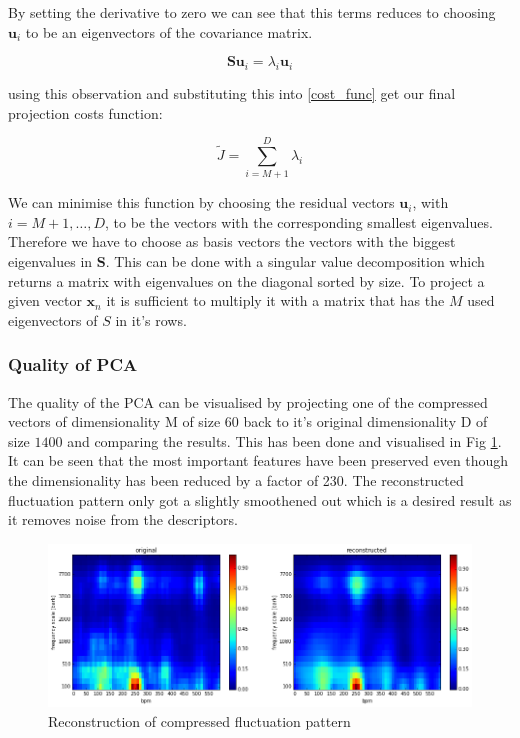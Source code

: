 \documentclass[cic,tc,english]{iiufrgs}
\begin{document}
By setting the derivative to zero we can see that this terms reduces to choosing $\bm{u}_i$ to be an eigenvectors of the covariance matrix.

\begin{equation}
\bm{S}\bm{u}_i = \lambda_i \bm{u}_i
\end{equation}

using this observation and substituting this into \ref{cost_func} get our final projection costs function:

\begin{equation}
\tilde{J} = \sum_{i = M+1}^{D} \lambda_i
\end{equation}

We can minimise this function by choosing the residual vectors $\bm{u}_i$, with $i = M+1, \ldots, D$, to be the vectors with the corresponding smallest eigenvalues. Therefore we have to choose as basis vectors the vectors with the biggest eigenvalues in $\bm{S}$. This can be done with a singular value decomposition which returns a matrix with eigenvalues on the diagonal sorted by size. To project a given vector $\bm{x}_n$ it is sufficient to multiply it with a matrix that has the $M$ used eigenvectors of $S$ in it's rows.

\subsubsection{Quality of PCA}
The quality of the PCA can be visualised by projecting one of the compressed vectors of dimensionality M of size $60$ back to it's original dimensionality D of size $1400$ and comparing the results. This has been done and visualised in Fig \ref{fig:rec}. It can be seen that the most important features have been preserved even though the dimensionality has been reduced by a factor of 230. The reconstructed fluctuation pattern only got a slightly smoothened out which is a desired result as it removes noise from the descriptors.

\begin{figure}
    \caption{Reconstruction of compressed fluctuation pattern}
    \begin{center}
        \includegraphics[width=\linewidth]{reconstructed}
    \end{center}
    \label{fig:rec}
\end{figure}
\end{document}

